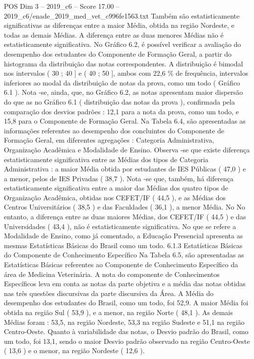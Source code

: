 \begin{textsample}{POS Dim 3 – 2019\_c6 – Score 17.00 – 2019\_c6/enade\_2019\_med\_vet\_c996fe1563.txt}
Também são estatisticamente significativas as diferenças entre a maior Média, obtida na região Nordeste, e todas as demais Médias.
A diferença entre as duas menores Médias não é estatisticamente significativa.
No Gráfico 6.2, é possível verificar a avaliação do desempenho dos estudantes do Componente de Formação Geral, a partir do histograma da distribuição das notas correspondentes.
A distribuição é bimodal nos intervalos ( 30 ; 40 ] e ( 40 ; 50 ], ambos com 22,6 \% de frequência, intervalos inferiores ao modal da distribuição de notas da prova, como um todo ( Gráfico 6.1 ).
Nota -se, ainda, que, no Gráfico 6.2, as notas apresentam maior dispersão do que as no Gráfico 6.1 ( distribuição das notas da prova ), confirmada pela comparação dos desvios padrões : 12,1 para a nota da prova, como um todo, e 15,8 para o Componente de Formação Geral.
Na Tabela 6.4, são apresentadas as informações referentes ao desempenho dos concluintes do Componente de Formação Geral, em diferentes agregações : Categoria Administrativa, Organização Acadêmica e Modalidade de Ensino.
Observa -se que existe diferença estatisticamente significativa entre as Médias dos tipos de Categoria Administrativa : a maior Média obtida por estudantes de IES Públicas ( 47,0 ) e a menor, pelos de IES Privadas ( 38,7 ).
Nota -se que, também, há diferença estatisticamente significativa entre a maior das Médias dos quatro tipos de Organização Acadêmica, obtidas nos CEFET/IF ( 44,5 ), e as Médias dos Centros Universitários ( 38,5 ) e das Faculdades ( 36,1 ), a menor Média.
No No entanto, a diferença entre as duas maiores Médias, dos CEFET/IF ( 44,5 ) e das Universidades ( 43,4 ), não é estatisticamente significativa.
No que se refere a Modalidade de Ensino, como já comentado, a Educação Presencial apresenta as mesmas Estatísticas Básicas do Brasil como um todo. 6.1.3 Estatísticas Básicas do Componente de Conhecimento Específico Na Tabela 6.5, são apresentadas as Estatísticas Básicas referentes ao Componente de Conhecimento Específico da área de Medicina Veterinária.
A nota do componente de Conhecimentos Específicos leva em conta as notas da parte objetiva e a média das notas obtidas nas três questões discursivas da parte discursiva da Área.
A Média do desempenho dos estudantes do Brasil, como um todo, foi 52,9.
A maior Média foi obtida na região Sul ( 53,9 ), e a menor, na região Norte ( 48,1 ).
As demais Médias foram : 53,5, na região Nordeste, 53,3 na região Sudeste e 51,1 na região Centro-Oeste.
Quanto à variabilidade das notas, o Desvio padrão do Brasil, como um todo, foi 13,1, sendo o maior Desvio padrão observado na região Centro-Oeste ( 13,6 ) e o menor, na região Nordeste ( 12,6 ).

\end{textsample}
